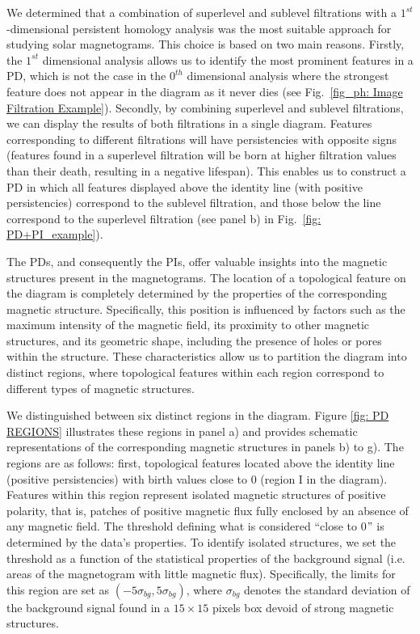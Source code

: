 \documentclass[12pt]{mythesis}
\begin{document}
We determined that a combination of superlevel and sublevel filtrations with a $1^{st}$-dimensional persistent homology analysis was the most suitable approach for studying solar magnetograms. This choice is based on two main reasons. Firstly, the $1^{st}$ dimensional analysis allows us to identify the most prominent features in a PD, which is not the case in the $0^{th}$ dimensional analysis where the strongest feature does not appear in the diagram as it never dies (see Fig.~\ref{fig_ph: Image Filtration Example}). Secondly, by combining superlevel and sublevel filtrations, we can display the results of both filtrations in a single diagram. Features corresponding to different filtrations will have persistencies with opposite signs (features found in a superlevel filtration will be born at higher filtration values than their death, resulting in a negative lifespan). This enables us to construct a PD in which all features displayed above the identity line (with positive persistencies) correspond to the sublevel filtration, and those below the line correspond to the superlevel filtration (see panel b) in Fig.~\ref{fig: PD+PI_example}).

The PDs, and consequently the PIs, offer valuable insights into the magnetic structures present in the magnetograms. The location of a topological feature on the diagram is completely determined by the properties of the corresponding magnetic structure. Specifically, this position is influenced by factors such as the maximum intensity of the magnetic field, its proximity to other magnetic structures, and its geometric shape, including the presence of holes or pores within the structure. These characteristics allow us to partition the diagram into distinct regions, where topological features within each region correspond to different types of magnetic structures.


We distinguished between six distinct regions in the diagram. Figure \ref{fig: PD REGIONS} illustrates these regions in panel a) and provides schematic representations of the corresponding magnetic structures in panels b) to g). The regions are as follows: first, topological features located above the identity line (positive persistencies) with birth values close to 0 (region I in the diagram). Features within this region represent isolated magnetic structures of positive polarity, that is, patches of positive magnetic flux fully enclosed by an absence of any magnetic field. The threshold defining what is considered ``close to 0$"$ is determined by the data's properties. To identify isolated structures, we set the threshold as a function of the statistical properties of the background signal (i.e. areas of the magnetogram with little magnetic flux). Specifically, the limits for this region are set as $(-5 \sigma _ {bg}, 5 \sigma _ {bg})$, where $\sigma _ {bg}$ denotes the standard deviation of the background signal found in a $15\times 15$ pixels box devoid of strong magnetic structures.
\end{document}
